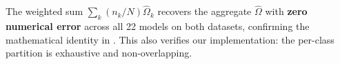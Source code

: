 The weighted sum $\sum_k (n_k/N)\hat{\Omega}_k$ recovers the aggregate $\hat{\Omega}$ with \textbf{zero numerical error} across all 22 models on both datasets, confirming the mathematical identity in . This also verifies our implementation: the per-class partition is exhaustive and non-overlapping.


%
